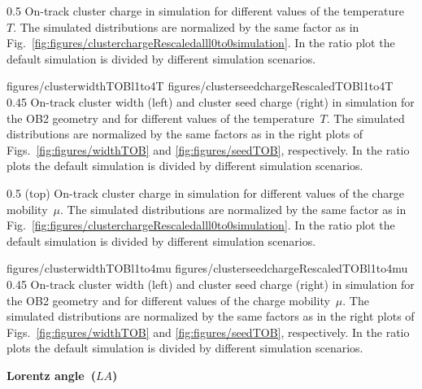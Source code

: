                  {0.5}       %
                 { On-track cluster charge in simulation for different values of the temperature~$T$.   The simulated distributions are normalized by the same factor as in Fig.~\ref{fig:figures/clusterchargeRescaledalll0to0simulation}.  In the ratio plot the default simulation is divided by different simulation scenarios. }

                 {figures/clusterwidthTOBl1to4T}
                 {figures/clusterseedchargeRescaledTOBl1to4T} %
                 {0.45}       %
                 {  On-track cluster width (left) and cluster seed charge (right) in simulation  for the OB2 geometry and for different values of the temperature~$T$.  The simulated distributions are normalized by the same factors as in the right plots of Figs.~\ref{fig:figures/widthTOB} and \ref{fig:figures/seedTOB}, respectively.   In the ratio plots the default simulation is divided by different simulation scenarios. }

                 {0.5}       %
                 { (top) On-track cluster charge in simulation for different values of the charge mobility~$\mu$.   The simulated distributions are normalized by the same factor as in Fig.~\ref{fig:figures/clusterchargeRescaledalll0to0simulation}.  In the ratio plot the default simulation is divided by different simulation scenarios. }

                 {figures/clusterwidthTOBl1to4mu}
                 {figures/clusterseedchargeRescaledTOBl1to4mu} %
                 {0.45}       %
                 { On-track cluster width (left) and cluster seed charge (right) in simulation  for the OB2 geometry and for different values of the charge mobility~$\mu$.  The simulated distributions are normalized by the same factors as in the right plots of Figs.~\ref{fig:figures/widthTOB} and \ref{fig:figures/seedTOB}, respectively.   In the ratio plots the default simulation is divided by different simulation scenarios. }

\textbf{Lorentz angle~($LA$)}

